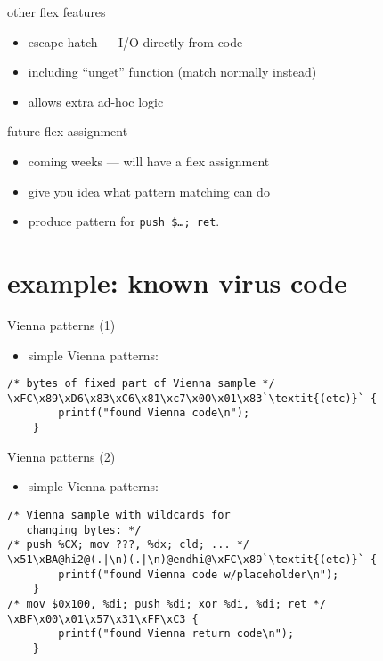 \begin{frame}{other flex features}
    \begin{itemize}
    \item escape hatch --- I/O directly from code
    \item including ``unget'' function (match normally instead)
    \item allows extra ad-hoc logic
    \end{itemize}
\end{frame}

\begin{frame}{future flex assignment}
    \begin{itemize}
    \item coming weeks --- will have a flex assignment
    \vspace{.5cm}
    \item give you idea what pattern matching can do
    \item produce pattern for {\tt push \$\ldots; ret}.
    \end{itemize}
\end{frame}

\section{example: known virus code}

\begin{frame}[fragile,label=ViennaPat1]{Vienna patterns (1)}
\begin{itemize}
\item simple Vienna patterns:
\end{itemize}
\begin{lstlisting}
/* bytes of fixed part of Vienna sample */
\xFC\x89\xD6\x83\xC6\x81\xc7\x00\x01\x83`\textit{(etc)}` {
        printf("found Vienna code\n");
    }
\end{lstlisting}
\end{frame}


\begin{frame}[fragile,label=ViennaPat2]{Vienna patterns (2)}
\begin{itemize}
\item simple Vienna patterns:
\end{itemize}
\begin{lstlisting}
/* Vienna sample with wildcards for
   changing bytes: */
/* push %CX; mov ???, %dx; cld; ... */
\x51\xBA@hi2@(.|\n)(.|\n)@endhi@\xFC\x89`\textit{(etc)}` {
        printf("found Vienna code w/placeholder\n");
    }
/* mov $0x100, %di; push %di; xor %di, %di; ret */
\xBF\x00\x01\x57\x31\xFF\xC3 {
        printf("found Vienna return code\n");
    }
\end{lstlisting}
\end{frame}

